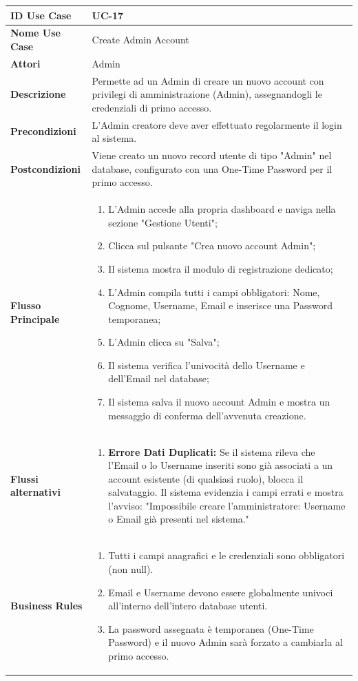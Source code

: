 \documentclass{article}
\newcommand{\usecasetable}[9]{
	\begin{table}[h!]
		\centering
		\footnotesize
		\renewcommand{\arraystretch}{1.4}
		\begin{tabularx}{\textwidth}{|l|>{\raggedright\arraybackslash}X|}
			\hline
			\textbf{ID Use Case} & #1 \\ \hline
			\textbf{Nome Use Case} & #2 \\ \hline
			\textbf{Attori} & #3 \\ \hline
			\textbf{Descrizione} & #4 \\ \hline
			\textbf{Precondizioni} & #5 \\ \hline
			\textbf{Postcondizioni} & #6 \\ \hline
			\textbf{Flusso Principale} & #7 \\ \hline
			\textbf{Flussi alternativi} & #8 \\ \hline
			\textbf{Business Rules} & #9 \\ \hline
		\end{tabularx}
	\end{table}
}
\begin{document}
	\newpage
	
	\usecasetable
	{UC-17}
	{Create Admin Account}
	{Admin}
	{Permette ad un Admin di creare un nuovo account con privilegi di amministrazione (Admin), assegnandogli le credenziali di primo accesso.}
	{L'Admin creatore deve aver effettuato regolarmente il login al sistema.}
	{Viene creato un nuovo record utente di tipo "Admin" nel database, configurato con una One-Time Password per il primo accesso.}
	{
		\begin{enumerate}[nosep, leftmargin=*]
			\item L'Admin accede alla propria dashboard e naviga nella sezione "Gestione Utenti";
			\item Clicca sul pulsante "Crea nuovo account Admin";
			\item Il sistema mostra il modulo di registrazione dedicato;
			\item L'Admin compila tutti i campi obbligatori: Nome, Cognome, Username, Email e inserisce una Password temporanea;
			\item L'Admin clicca su "Salva";
			\item Il sistema verifica l'univocità dello Username e dell'Email nel database;
			\item Il sistema salva il nuovo account Admin e mostra un messaggio di conferma dell'avvenuta creazione.
		\end{enumerate}
	}
	{
		\begin{enumerate}[nosep, leftmargin=25px]
			\item[\textbf{6a-e.}] \textbf{Errore Dati Duplicati:} Se il sistema rileva che l'Email o lo Username inseriti sono già associati a un account esistente (di qualsiasi ruolo), blocca il salvataggio. Il sistema evidenzia i campi errati e mostra l'avviso: "Impossibile creare l'amministratore: Username o Email già presenti nel sistema."
		\end{enumerate}
	}
	{
		\begin{enumerate}[nosep, leftmargin=*]
			\item[•] Tutti i campi anagrafici e le credenziali sono obbligatori (non null).
			\item[•] Email e Username devono essere globalmente univoci all'interno dell'intero database utenti.
			\item[•] La password assegnata è temporanea (One-Time Password) e il nuovo Admin sarà forzato a cambiarla al primo accesso.
		\end{enumerate}
	}
		
	\newpage
	
\end{document}
